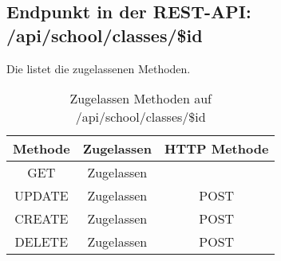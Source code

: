 \subsection{Endpunkt in der REST-API: /api/school/classes/\$id}
Die  listet die zugelassenen Methoden. 

\begin{table}[!htbp]
	\begin{tabular}{|c|c|c|}
		\hline
			\textbf{Methode} & \textbf{Zugelassen} & \textbf{HTTP Methode} \\ \hline
			GET & Zugelassen &  \\ \hline
			UPDATE & Zugelassen & POST \\ \hline 
			CREATE & Zugelassen & POST \\ \hline 
			DELETE & Zugelassen & POST \\ \hline
	\end{tabular}

		\caption{Zugelassen Methoden auf /api/school/classes/\$id}
		\label{tab:end:rest:api:school:classes:id:meth}
\end{table}